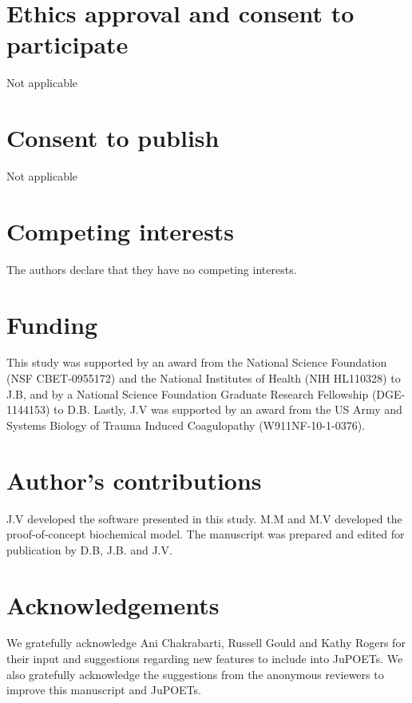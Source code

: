 \documentclass{bmcart}
\begin{document}

\begin{backmatter}

\section*{Ethics approval and consent to participate}
Not applicable

\section*{Consent to publish}
Not applicable

\section*{Competing interests}
  The authors declare that they have no competing interests.

\section*{Funding}
This study was supported by an award from the National Science Foundation (NSF CBET-0955172) and the National Institutes of Health (NIH HL110328) to J.B, and by
a National Science Foundation Graduate Research Fellowship (DGE-1144153) to D.B. Lastly, J.V was supported by an award from
the US Army and Systems Biology of Trauma Induced Coagulopathy (W911NF-10-1-0376).

\section*{Author's contributions}
    J.V developed the software presented in this study. M.M and M.V developed the proof-of-concept biochemical model.
    The manuscript was prepared and edited for publication by D.B, J.B. and J.V.

\section*{Acknowledgements}
We gratefully acknowledge Ani Chakrabarti, Russell Gould and Kathy Rogers for their input and suggestions regarding new features to include into JuPOETs.
We also gratefully acknowledge the suggestions from the anonymous reviewers to improve this manuscript and JuPOETs.


\end{backmatter}
\end{document}
